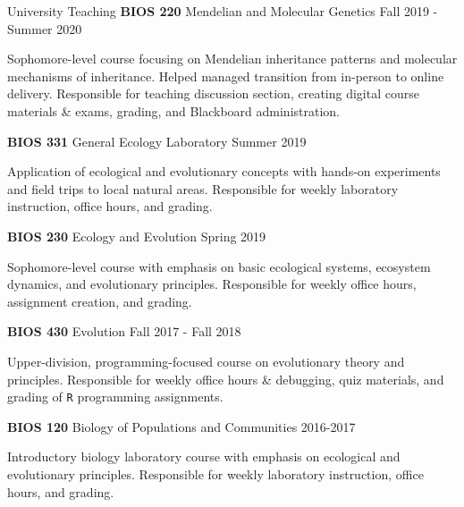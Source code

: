 \documentclass[]{resume}
\begin{document}
\begin{rSection}{University Teaching}
    \textbf{BIOS 220} Mendelian and Molecular Genetics \hfill Fall 2019
- Summer 2020
     
    \vspace{-0.30cm}
     Sophomore-level course focusing on Mendelian inheritance patterns
and molecular mechanisms of inheritance. Helped managed transition from
in-person to online delivery. Responsible for teaching discussion
section, creating digital course materials \& exams, grading, and
Blackboard administration.\\
     
\vspace{-0.3cm}

    \textbf{BIOS 331} General Ecology Laboratory \hfill Summer 2019
     
    \vspace{-0.30cm}
     Application of ecological and evolutionary concepts with hands-on
experiments and field trips to local natural areas. Responsible for
weekly laboratory instruction, office hours, and grading.\\
     
\vspace{-0.3cm}

    \textbf{BIOS 230} Ecology and Evolution \hfill Spring 2019
     
    \vspace{-0.30cm}
     Sophomore-level course with emphasis on basic ecological systems,
ecosystem dynamics, and evolutionary principles. Responsible for weekly
office hours, assignment creation, and grading.\\
     
\vspace{-0.3cm}

    \textbf{BIOS 430} Evolution \hfill Fall 2017 - Fall 2018
     
    \vspace{-0.30cm}
     Upper-division, programming-focused course on evolutionary theory
and principles. Responsible for weekly office hours \& debugging, quiz
materials, and grading of \texttt{R} programming
\linebreak assignments.\\
     
\vspace{-0.3cm}

    \textbf{BIOS 120} Biology of Populations and
Communities \hfill 2016-2017
     
    \vspace{-0.30cm}
     Introductory biology laboratory course with emphasis on ecological
and evolutionary principles. Responsible for weekly laboratory
instruction, office hours, and grading.\\
     
\vspace{-0.3cm}

\end{rSection}
\end{document}
